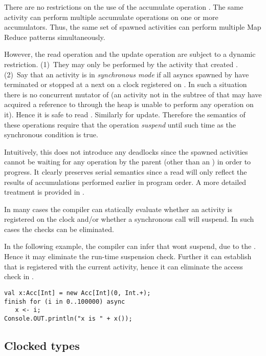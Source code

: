 There are no restrictions on the use of the accumulate operation
. The same activity can perform multiple accumulate
operations on one or more accumulators. Thus, the same set of spawned
activities can perform multiple Map Reduce patterns simultaneously.

However, the read operation  and the update operation
 are subject to a dynamic restriction. (1)~They may only
be performed by the activity that created . (2)~Say that an
activity  is in {\em synchronous mode} if all asyncs spawned
by  have terminated or stopped at a next on a clock registered
on .  In such a situation there is no concurrent mutator of
 (an activity not in the subtree of  that may have
acquired a reference to  through the heap is unable to perform
any operation on it). Hence it is safe to read . Similarly for
update. Therefore the semantics of these operations require that the
operation {\em suspend} until such time as the synchronous condition
is true.

Intuitively, this does not introduce any deadlocks since the
spawned activities cannot be waiting for any operation by the parent
(other than an ) in order to progress. It clearly
preserves serial semantics since a read will only reflect the results
of accumulations performed earlier in program order. A more detailed
treatment is provided in .


In many cases the compiler can statically evaluate whether an activity
is registered on the clock and/or whether a synchronous call will
suspend. In such cases the checks can be eliminated.
\begin{example}
In the following example, the compiler can infer that  wont suspend, due to
the . Hence it may eliminate the run-time suspension
check. Further it can establish that  is 
registered with the current activity, hence it can eliminate the
access check in .
\begin{lstlisting}
val x:Acc[Int] = new Acc[Int](0, Int.+);
finish for (i in 0..100000) async
   x <- i;
Console.OUT.println("x is " + x());
\end{lstlisting}

\end{example}

\subsection{Clocked types}

